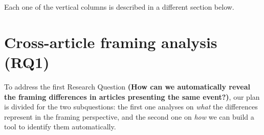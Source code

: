 Each one of the vertical columns is described in a different section below.



\section{Cross-article framing analysis (RQ1)}
\label{sec:prop_rq1}

To address the first Research Question
\textbf{(How can we automatically reveal the framing differences in articles presenting the same event?)}, our plan is divided for the two subquestions: the first one analyses on \textit{what} the differences represent in the framing perspective, and the second one on \textit{how} we can build a tool to identify them automatically.




